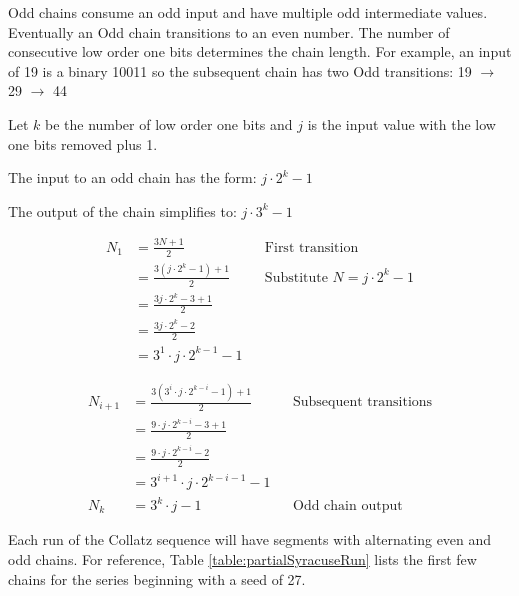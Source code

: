 \documentclass[preprint]{sigplanconf}
\begin{document}
Odd chains consume an odd input and have multiple odd intermediate values. Eventually an Odd chain transitions to an even number. The number of consecutive low order one bits determines the chain length. For example, an input of 19 is a binary 10011 so the subsequent chain has two Odd transitions: 19 $\to$ 29 $\to$ 44

Let \( k \) be the number of low order one bits and \( j \) is the input value with the low one bits removed plus 1.

The input to an odd chain has the form: \( j \cdot 2^k - 1 \)

The output of the chain simplifies to: \( j \cdot 3^k - 1 \)

\begin{align*}
    N_1 & = \frac{3N + 1}{2}                 &  & \text{First transition}                \\
        & = \frac{3(j \cdot 2^k - 1) + 1}{2} &  & \text{Substitute } N = j \cdot 2^k - 1 \\
        & = \frac{3j \cdot 2^k - 3 + 1}{2}                                               \\
        & = \frac{3j \cdot 2^k - 2}{2}                                                   \\
        & = 3^1 \cdot j \cdot 2^{k-1} - 1
\end{align*}

\begin{align*}
    N_{i+1} & = \frac{3 \left(3^i \cdot j \cdot 2^{k-i} - 1\right) + 1}{2} &  & \text{Subsequent transitions} \\
            & = \frac{9 \cdot j \cdot 2^{k-i} - 3 + 1}{2}                                                     \\
            & = \frac{9 \cdot j \cdot 2^{k-i} - 2}{2}                                                         \\
            & = 3^{i+1} \cdot j \cdot 2^{k-i-1} - 1                                                           \\
    N_k     & = 3^k \cdot j - 1                                            &  & \text{Odd chain output}
\end{align*}

Each run of the Collatz sequence will have segments with alternating even and odd chains. For reference, Table \ref{table:partialSyracuseRun} lists the first few chains for the series beginning with a seed of 27.
\end{document}
